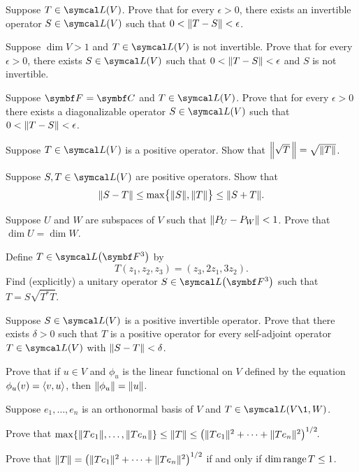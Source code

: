 \begin{exercises}
\exercise
Suppose $T \in \L(V)$. Prove that for every $\epsilon > 0$, there exists an invertible operator $S \in \L(V)$ such that
$0 < \norm{T - S} < \epsilon$. \label{7invert}


\exercise
Suppose $\dim V > 1$ and $T \in \L(V)$ is not invertible. Prove that for every $\epsilon > 0$, there exists
$S \in \L(V)$ such that $0 < \norm{T - S} < \epsilon$ and $S$ is not invertible.


\exercise
Suppose $\F{} = \C{}$ and $T \in \L(V)$. Prove that for every $\epsilon > 0$ there exists a diagonalizable operator $S \in \L(V)$ such that $0 < \norm{T - S} < \epsilon$.


\exercise
Suppose $T \in \L(V)$ is a positive operator. Show that $\norm[\Big]{\sqrt{T}\,} = \sqrt{\norm{T}}$.


\exercise
Suppose $S, T \in \L(V)$ are positive operators. Show that
\[
\norm{S-T} \le \max\br[\big]{ \norm{S}, \norm{T} } \le \norm{S+T}.
\]
\exercisedisplayend


\exercise
Suppose $U$ and $W$ are subspaces of $V$ such that $\norm{P_U - P_W} < 1$. Prove that $\dim U = \dim W$.


\pagebreak[3]

\exercise
Define $T \in \L\paren[\big]{\F{3}}$ by
\[
T(z_1, z_2, z_3) = (z_3, 2z_1, 3z_2).
\]
Find (explicitly) a unitary operator $S \in \L\paren[\big]{\F{3}}$ such that $T = S \sqrt{T^*T}$.


\exercise
Suppose $S \in \L(V)$ is a positive invertible operator. Prove that there exists $\delta > 0$ such that $T$ is a positive operator for every self-adjoint operator $T \in \L(V)$ with $\norm{S-T} < \delta$.


\exercise
Prove that if $u \in V$ and $\phi_u$ is the linear functional on $V$ defined by the equation $\phi_u(v) = \ip{v, u}$, then
$\norm{\phi_u} = \norm{u}$.


\exercise
Suppose $e_1, \ldots, e_n$ is an orthonormal basis of $V$ and $T \in \L(V\1,W)$.
\begin{subtheorem}
\item
Prove that
$\max\br{ \norm{Te_1}, \ldots, \norm{Te_n} }
\le \norm{T} \le \paren[\big]{ \norm{Te_1}^2 + \cdots + \norm{Te_n}^2 }^{1/2}\!$.
\item
Prove that $\norm{T} = \paren[\big]{ \norm{Te_1}^2 + \cdots + \norm{Te_n}^2 }^{1/2}$ if and only if $\dim \ran T \le 1$.
\end{subtheorem}



\end{exercises}
